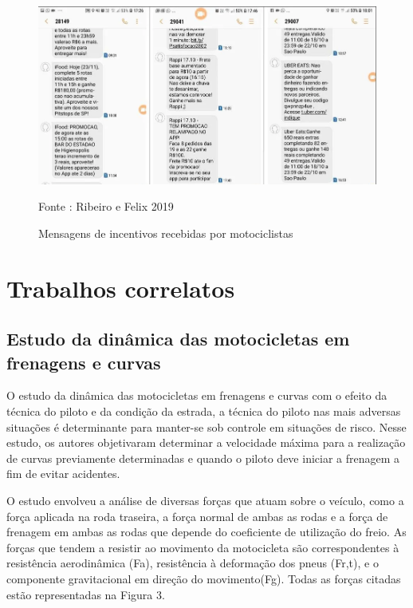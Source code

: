  \begin{figure}[H] 

 \caption{Mensagens de incentivos recebidas por motociclistas}
  \includegraphics[width=\textwidth]{images/Cap2/whtas.png}

 \scriptsize  Fonte : Ribeiro e Felix 2019 
  
\end{figure}



\section{Trabalhos correlatos}


\subsection{\textbf{Estudo da dinâmica das motocicletas em frenagens e curvas}}


 O estudo da dinâmica das motocicletas em frenagens e curvas com o efeito da técnica do piloto e da condição da estrada, a técnica do piloto nas mais adversas situações é determinante para manter-se sob controle em situações de risco. Nesse estudo, os autores objetivaram determinar a velocidade máxima para a realização de curvas previamente determinadas e quando o piloto deve iniciar a frenagem a fim de evitar acidentes.\cite{Magnani2017Saulo}

O estudo envolveu a análise de diversas forças que atuam sobre o veículo, como a força aplicada na roda traseira, a força normal de ambas as rodas e a força de frenagem em ambas as rodas que depende do coeficiente de utilização do freio.  As forças que tendem a resistir ao movimento da motocicleta são correspondentes à resistência aerodinâmica (Fa), resistência à deformação dos pneus (Fr,t), e o componente gravitacional em direção do movimento(Fg). Todas as forças citadas estão representadas na Figura 3.




